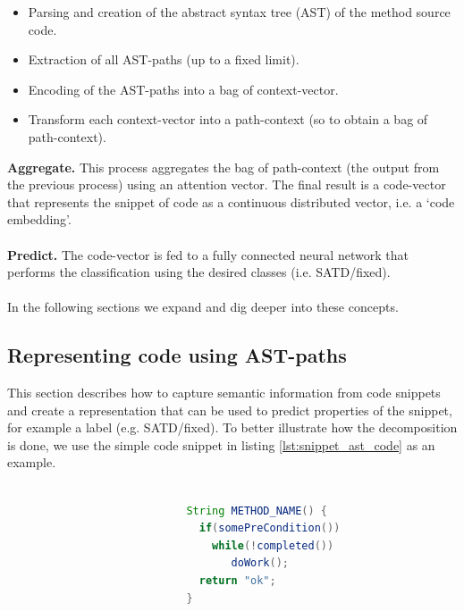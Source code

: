 \begin{itemize}
    \item Parsing and creation of the abstract syntax tree (AST) of the method source code. 
    \item Extraction of all AST-paths (up to a fixed limit).
    \item Encoding of the AST-paths into a bag of context-vector.
    \item Transform each context-vector into a path-context (so to obtain a bag of path-context).
\end{itemize}

\noindent \textbf{Aggregate.} This process aggregates the bag of path-context (the output from the previous process) using an attention vector. The final result is a code-vector that represents the snippet of code as a continuous distributed vector, i.e. a `code embedding'.
\\
\\
\noindent \textbf{Predict.} The code-vector is fed to a fully connected neural network that performs the classification using the desired classes (i.e. SATD/fixed).
\\
\\
\noindent In the following sections we expand and dig deeper into these concepts.


\subsection{Representing code using AST-paths} \label{sec:code2vec_ast_paths}
This section describes how to capture semantic information from code snippets and create a representation that can be used to predict properties of the snippet, for example a label (e.g. SATD/fixed).
To better illustrate how the decomposition is done, we use the simple code snippet in listing \ref{lst:snippet_ast_code} as an example.

\begin{lstlisting}[caption={Example code to show decomposition}, label={lst:snippet_ast_code},language=Java]

                            String METHOD_NAME() {
                              if(somePreCondition())
                                while(!completed())
                                   doWork();
                              return "ok";
                            }
                            
\end{lstlisting}

